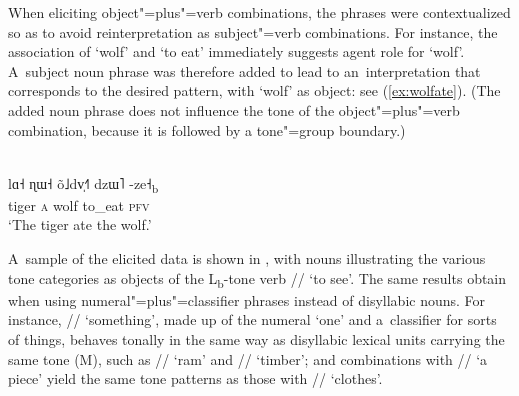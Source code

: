 When eliciting object"=plus"=verb combinations, the phrases were contextualized so as to avoid reinterpretation as subject"=verb combinations. For instance, the association of ‘wolf’ and ‘to eat’
immediately suggests agent role for ‘wolf’. A~subject noun phrase was therefore added to
lead to an~interpretation that corresponds to the desired pattern, with ‘wolf’ as object: see (\ref{ex:wolfate}). (The added noun phrase does not influence the tone of the object"=plus"=verb combination, because it is followed by a tone"=group boundary.) 

\begin{exe}
	\ex
	\label{ex:wolfate}
	\\
	\gll lɑ˧	ɳɯ˧	õ˩dv̩˧˥	dzɯ˥		-ze˧\textsubscript{b}\\
	tiger		\textsc{a}		wolf	to\_eat		\textsc{pfv}\\
	\glt ‘The tiger ate the wolf.’
\end{exe}

A~sample of the elicited data is shown in , with nouns illustrating the various tone categories as objects of the L\textsubscript{b}-tone verb // ‘to see'. The same results obtain when using numeral"=plus"=classifier phrases instead of disyllabic nouns. For instance, // ‘something’, made up of the numeral ‘one’ and a~classifier for sorts of things, behaves tonally in the same way as disyllabic lexical units carrying the same tone (M), such as // ‘ram’ and // ‘timber’; and combinations with
// ‘a piece’ yield the same tone patterns as those with // ‘clothes’. 

